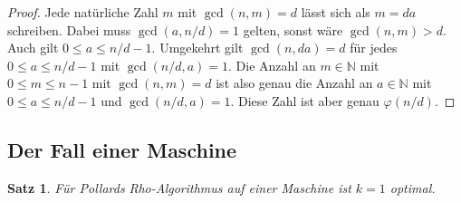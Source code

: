 \documentclass[a4paper, 10pt, ngerman]{article}
\newcommand{\N}{\mathbb{N}}
\newtheorem{theorem}{Satz}
\begin{document}
\begin{proof}
    Jede natürliche Zahl $m$ mit $\gcd(n, m) = d$ lässt sich als $m = da$ schreiben. Dabei muss $\gcd(a, n / d) = 1$ gelten, sonst wäre $\gcd(n, m) > d$. Auch gilt $0 \le a \le n/d - 1$. Umgekehrt gilt $\gcd(n, da) = d$ für jedes $0 \le a \le n/d - 1$ mit $\gcd(n/d, a) = 1$. Die Anzahl an $m \in \N$ mit $0 \le m \le n - 1$ mit $\gcd(n, m) = d$ ist also genau die Anzahl an $a \in \N$ mit $0 \le a \le  n / d - 1$ und $\gcd(n / d, a) = 1$. Diese Zahl ist aber genau $\varphi(n/d)$.
\end{proof}

\subsection{Der Fall einer Maschine}

\begin{theorem}
    Für Pollards Rho-Algorithmus auf einer Maschine ist $k = 1$ optimal.
\end{theorem}
\end{document}
